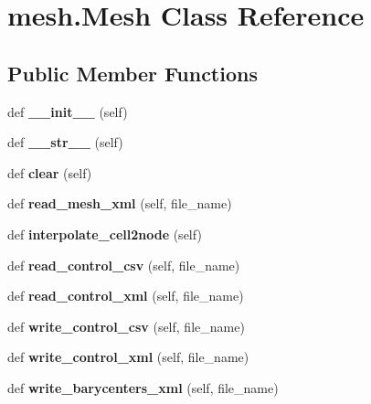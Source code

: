 \hypertarget{classmesh_1_1Mesh}{}\section{mesh.\+Mesh Class Reference}
\label{classmesh_1_1Mesh}
\subsection*{Public Member Functions}
\begin{DoxyCompactItemize}
\item 
\mbox{\label{classmesh_1_1Mesh_addb129a90452df779740275c9e97b2ee}} 
def {\bfseries \+\_\+\+\_\+init\+\_\+\+\_\+} (self)
\item 
\mbox{\label{classmesh_1_1Mesh_a0e3c8b565fd6502b16cd2c075e861635}} 
def {\bfseries \+\_\+\+\_\+str\+\_\+\+\_\+} (self)
\item 
\mbox{\label{classmesh_1_1Mesh_a7140e72e3b248afaf1fbe5791bd07679}} 
def {\bfseries clear} (self)
\item 
\mbox{\label{classmesh_1_1Mesh_a7aff8aa8badefcb845890649cd54dc8d}} 
def {\bfseries read\+\_\+mesh\+\_\+xml} (self, file\+\_\+name)
\item 
\mbox{\label{classmesh_1_1Mesh_a512a630d8e15f8a5acbfff07d87b9dd9}} 
def {\bfseries interpolate\+\_\+cell2node} (self)
\item 
\mbox{\label{classmesh_1_1Mesh_afc4ba44d2c3ca4fb318d8c5ab28d7cff}} 
def {\bfseries read\+\_\+control\+\_\+csv} (self, file\+\_\+name)
\item 
\mbox{\label{classmesh_1_1Mesh_a0d86fdca66e4582ffc1b85502375f1cd}} 
def {\bfseries read\+\_\+control\+\_\+xml} (self, file\+\_\+name)
\item 
\mbox{\label{classmesh_1_1Mesh_a01ac5a14c6d0998317f619ac16d0f9f6}} 
def {\bfseries write\+\_\+control\+\_\+csv} (self, file\+\_\+name)
\item 
\mbox{\label{classmesh_1_1Mesh_a33b2b5cf4e35bfe44407eef364de3141}} 
def {\bfseries write\+\_\+control\+\_\+xml} (self, file\+\_\+name)
\item 
\mbox{\label{classmesh_1_1Mesh_a41a3e2655e1c79c6aca6776693f209e6}} 
def {\bfseries write\+\_\+barycenters\+\_\+xml} (self, file\+\_\+name)
\end{DoxyCompactItemize}
